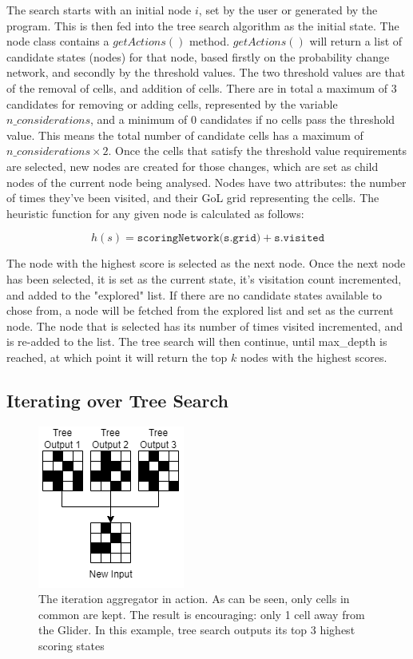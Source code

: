 \documentclass{l4proj}
\begin{document}
The search starts with an initial node $i$, set by the user or generated by the program. This is then fed into the tree search algorithm as the initial state. The node class contains a $getActions()$ method. $getActions()$ will return a list of candidate states (nodes) for that node, based firstly on the probability change network, and secondly by the threshold values. The two threshold values are that of the removal of cells, and addition of cells. There are in total a maximum of 3 candidates for removing or adding cells, represented by the variable $n\_considerations$, and a minimum of 0 candidates if no cells pass the threshold value. This means the total number of candidate cells has a maximum of $n\_considerations \times 2$. Once the cells that satisfy the threshold value requirements are selected, new nodes are created for those changes, which are set as child nodes of the current node being analysed. Nodes have two attributes: the number of times they've been visited, and their GoL grid representing the cells. The heuristic function for any given node is calculated as follows:

\[ h(s) = \texttt{scoringNetwork(s.grid)} + \texttt{s.visited} \]
 
The node with the highest score is selected as the next node. Once the next node has been selected, it is set as the current state, it's visitation count incremented, and added to the "explored" list. If there are no candidate states available to chose from, a node will be fetched from the explored list and set as the current node. The node that is selected has its number of times visited incremented, and is re-added to the list. The tree search will then continue, until max\_depth is reached, at which point it will return the top $k$ nodes with the highest scores.

\subsection{Iterating over Tree Search}

\begin{figure}[h!]
\centering
\includegraphics[width=0.4\linewidth]{dissertation/images/diagrams/iteration_aggregator.png}
\caption{The iteration aggregator in action. As can be seen, only cells in common are kept. The result is encouraging: only 1 cell away from the Glider. In this example, tree search outputs its top 3 highest scoring states}
\label{fig:subim1}
\end{figure}
\end{document}
